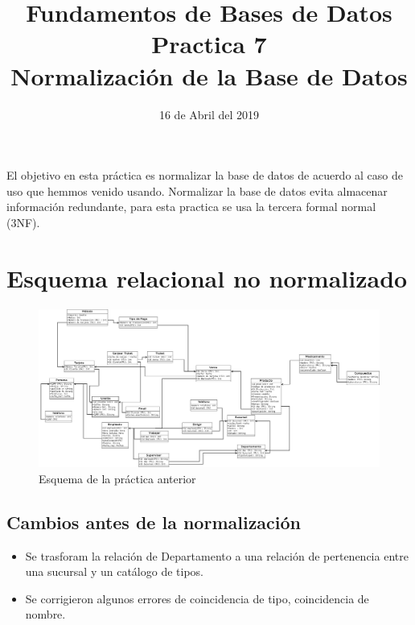 \documentclass[10pt]{article}
\begin{document}
	
	\title{Fundamentos de Bases de Datos \\
		Practica 7\\ Normalización de la Base de Datos
	} 
	\author{}
	\date{16 de Abril del 2019}
	\maketitle
	

El objetivo en esta práctica es normalizar la base de datos de acuerdo al caso 
de uso que hemmos venido usando. Normalizar la base de datos evita almacenar 
información redundante,  para esta practica se usa la tercera formal normal (3NF).

\section{Esquema relacional no normalizado}

\begin{figure}[H]
	\centering
	\includegraphics[scale=0.2 ]{practica05.jpeg}
	\caption{Esquema de la práctica anterior}
	\label{fg:esqA}
\end{figure}

\subsection{Cambios antes de la normalización}
\begin{itemize}
	\item Se trasforam la relación de Departamento a una relación de pertenencia
	entre una sucursal y un catálogo de tipos.
	\item Se corrigieron algunos errores de coincidencia de tipo, coincidencia
	de nombre.
\end{itemize}
\end{document}
